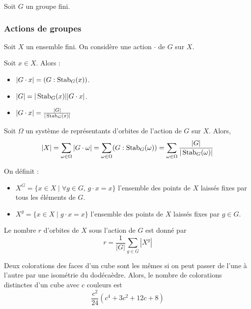  Soit $G$ un groupe fini.

  \subsubsection{Actions de groupes}


  Soit $X$ un ensemble fini. On considère une action $\cdot$ de $G$ sur $X$.

  \begin{proposition}
    Soit $x \in X$. Alors :
    \begin{itemize}
      \item $|G \cdot x| = (G : \operatorname{Stab}_G(x))$.
      \item $|G| = |\operatorname{Stab}_G(x)| |G \cdot x|$.
      \item $|G \cdot x| = \frac{|G|}{|\operatorname{Stab}_G(x)|}$
    \end{itemize}
  \end{proposition}

  \begin{theorem}
    Soit $\Omega$ un système de représentants d'orbites de l'action de $G$ sur $X$. Alors,
    \[ |X| = \sum_{\omega \in \Omega} |G \cdot \omega| = \sum_{\omega \in \Omega} (G : \operatorname{Stab}_G(\omega)) = \sum_{\omega \in \Omega} \frac{|G|}{|\operatorname{Stab}_G(\omega)|} \]
  \end{theorem}

  \begin{definition}
    On définit :
    \begin{itemize}
      \item $X^G = \{ x \in X \mid \forall g \in G, \, g \cdot x = x \}$ l'ensemble des points de $X$ laissés fixes par tous les éléments de $G$.
      \item $X^g = \{ x \in X \mid g \cdot x = x \}$ l'ensemble des points de $X$ laissés fixes par $g \in G$.
    \end{itemize}
  \end{definition}

  \begin{theorem}
    Le nombre $r$ d'orbites de $X$ sous l'action de $G$ est donné par
    \[ r = \frac{1}{|G|} \sum_{g \in G} |X^g| \]
  \end{theorem}


  \begin{application}
    Deux colorations des faces d'un cube sont les mêmes si on peut passer de l'une à l'autre par une isométrie du dodécaèdre. Alors, le nombre de colorations distinctes d'un cube avec $c$ couleurs est
    \[ \frac{c^2}{24} (c^4 + 3c^2 + 12c + 8) \]
  \end{application}

